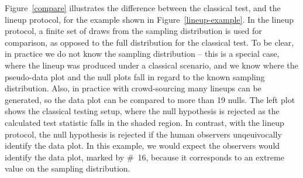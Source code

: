 \documentclass[12pt]{article}\usepackage[]{graphicx}\usepackage[]{color}
\begin{document}
Figure~\ref{compare} illustrates the difference between the classical test, and the lineup protocol, for the example shown in Figure~\ref{lineup-example}. In the lineup protocol, a finite set of draws from the sampling distribution is used for comparison, as opposed to the full distribution for the classical test. To be clear, in practice we do not know the sampling distribution -- this is a special case, where the lineup was produced under a classical scenario, and we know where the pseudo-data plot and the null plots fall in regard to the known sampling distribution. Also, in practice with crowd-sourcing many lineups can be generated, so the data plot can be compared to more than 19 nulls. The left plot shows the classical testing setup, where the null hypothesis is rejected as the calculated test statistic falls in the shaded region. In contrast, with the lineup protocol, the null hypothesis is rejected if the human observers unqeuivocally identify the data plot. In this example, we would expect the observers would identify the data plot, marked by \#~16, because it corresponds to an extreme value on the sampling distribution. 
\end{document}
